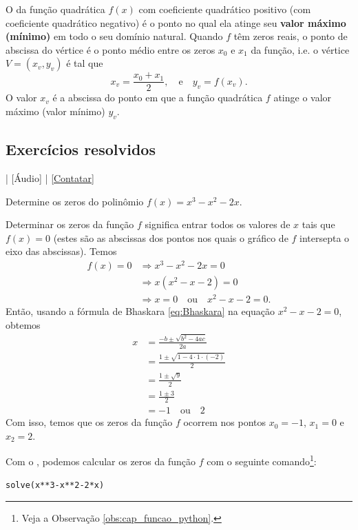 O  da função quadrática $f(x)$ com coeficiente quadrático positivo (com coeficiente quadrático negativo) é o ponto no qual ela atinge seu {\bf valor máximo (mínimo)} em todo o seu domínio natural. Quando $f$ têm zeros reais, o ponto de abscissa do vértice é o ponto médio entre os zeros $x_0$ e $x_1$ da função, i.e. o vértice $V = (x_v, y_v)$ é tal que
\begin{equation}
  x_v = \frac{x_0 + x_1}{2},\quad\text{e}\quad y_v = f(x_v). 
\end{equation}
O valor $x_v$ é a abscissa do ponto em que a função quadrática $f$ atinge o valor máximo (valor mínimo) $y_v$.


\subsection*{Exercícios resolvidos}

\begin{flushright}
  [Vídeo] | [Áudio] | \href{https://phkonzen.github.io/notas/contato.html}{[Contatar]}
\end{flushright}

\begin{exeresol}
  Determine os zeros do polinômio $f(x) = x^3-x^2-2x$.
\end{exeresol}
\begin{resol}
  Determinar os zeros da função $f$ significa entrar todos os valores de $x$ tais que $f(x)=0$ (estes são as abscissas dos pontos nos quais o gráfico de $f$ intersepta o eixo das abscissas). Temos
  \begin{align}
    f(x)=0 &\Rightarrow x^3-x^2-2x=0\\
           &\Rightarrow x(x^2-x-2)=0\\
           &\Rightarrow x=0\quad\text{ou}\quad x^2-x-2=0.
  \end{align}
  Então, usando a fórmula de Bhaskara \eqref{eq:Bhaskara} na equação $x^2-x-2=0$, obtemos
  \begin{align}
    x &= \frac{-b\pm\sqrt{b^2-4ac}}{2a} \\
      &= \frac{1\pm\sqrt{1-4\cdot 1\cdot (-2)}}{2}\\
      &= \frac{1\pm\sqrt{9}}{2}\\
      &= \frac{1\pm 3}{2}\\
      &= -1\quad\text{ou}\quad 2
  \end{align}
  Com isso, temos que os zeros da função $f$ ocorrem nos pontos $x_0 = -1$, $x_1=0$ e $x_2=2$.

  \ifispython
  Com o \sympy, podemos calcular os zeros da função $f$ com o seguinte comando\footnote{Veja a Observação \ref{obs:cap_funcao_python}.}:
\begin{verbatim}
solve(x**3-x**2-2*x)
\end{verbatim}
  \fi
\end{resol}


